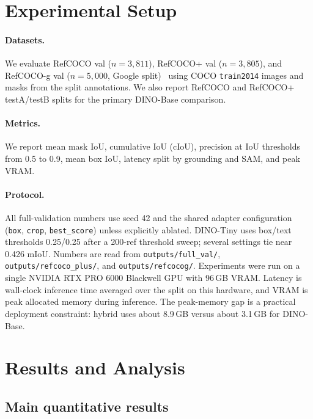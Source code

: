 \documentclass[11pt,a4paper]{article}
\begin{document}
\section{Experimental Setup}
\label{sec:experiments}

\paragraph{Datasets.}
We evaluate RefCOCO val ($n{=}3{,}811$), RefCOCO+ val ($n{=}3{,}805$), and RefCOCO-g val ($n{=}5{,}000$, Google split)~\cite{kazemzadeh2014refcoco,yu2016refcoco} using COCO \texttt{train2014} images and masks from the split annotations.
We also report RefCOCO and RefCOCO+ testA/testB splits for the primary DINO-Base comparison.

\paragraph{Metrics.}
We report mean mask IoU, cumulative IoU (cIoU), precision at IoU thresholds from 0.5 to 0.9, mean box IoU, latency split by grounding and SAM, and peak VRAM.

\paragraph{Protocol.}
All full-validation numbers use seed 42 and the shared adapter configuration (\texttt{box}, \texttt{crop}, \texttt{best\_score}) unless explicitly ablated.
DINO-Tiny uses box/text thresholds 0.25/0.25 after a 200-ref threshold sweep; several settings tie near 0.426 mIoU.
Numbers are read from \texttt{outputs/full\_val/}, \texttt{outputs/refcoco\_plus/}, and \texttt{outputs/refcocog/}.
Experiments were run on a single NVIDIA RTX PRO 6000 Blackwell GPU with 96\,GB VRAM.
Latency is wall-clock inference time averaged over the split on this hardware, and VRAM is peak allocated memory during inference.
The peak-memory gap is a practical deployment constraint: hybrid uses about 8.9\,GB versus about 3.1\,GB for DINO-Base.

\section{Results and Analysis}
\label{sec:results}

\subsection{Main quantitative results}
\label{sec:main-results}
\end{document}
